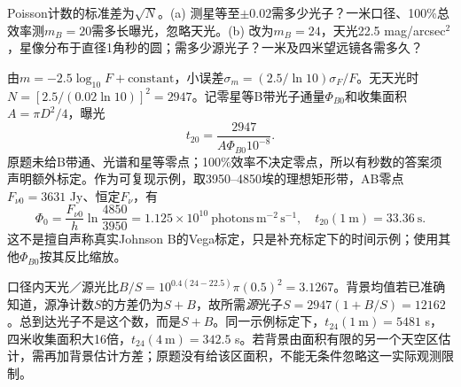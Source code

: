 \begin{exercise}
Poisson计数的标准差为$\sqrt N$。(a) 测星等至$\pm0.02$需多少光子？一米口径、100\%总效率测$m_B=20$需多长曝光，忽略天光。(b) 改为$m_B=24$，天光22.5 mag/arcsec$^2$，星像分布于直径1角秒的圆；需多少源光子？一米及四米望远镜各需多久？
\end{exercise}
\begin{solution}
由$m=-2.5\log_{10}F+\mathrm{constant}$，小误差$\sigma_m=(2.5/\ln10)\sigma_F/F$。无天光时$N=[2.5/(0.02\ln10)]^2=2947$。记零星等B带光子通量$\Phi_{B0}$和收集面积$A=\pi D^2/4$，曝光
\[
 t_{20}=\frac{2947}{A\Phi_{B0}10^{-8}}.
\]
原题未给B带通、光谱和星等零点；100\%效率不决定零点，所以有秒数的答案须声明额外标定。作为可复现示例，取3950--4850埃的理想矩形带，AB零点$F_{\nu0}=3631$ Jy、恒定$F_\nu$，有
\[
 \Phi_0=\frac{F_{\nu0}}h\ln\frac{4850}{3950}
 =1.125\times10^{10}\ \mathrm{photons\,m^{-2}\,s^{-1}},\quad
 t_{20}(1\ \mathrm m)=33.36\ \mathrm s.
\]
这不是擅自声称真实Johnson B的Vega标定，只是补充标定下的时间示例；使用其他$\Phi_{B0}$按其反比缩放。

口径内天光／源光比$B/S=10^{0.4(24-22.5)}\pi(0.5)^2=3.1267$。背景均值若已准确知道，源净计数$S$的方差仍为$S+B$，故所需\emph{源}光子$S=2947(1+B/S)=12162$。总到达光子不是这个数，而是$S+B$。同一示例标定下，$t_{24}(1\ \mathrm m)=5481$ s，四米收集面积大16倍，$t_{24}(4\ \mathrm m)=342.5$ s。若背景由面积有限的另一个天空区估计，需再加背景估计方差；原题没有给该区面积，不能无条件忽略这一实际观测限制。
\end{solution}
